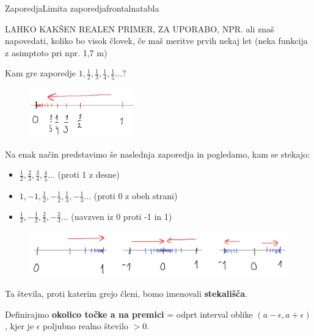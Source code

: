\begin{priprava}{}{}{Zaporedja}{Limita zaporedja}{frontalna}{tabla}

LAHKO KAKŠEN REALEN PRIMER, ZA UPORABO, NPR. ali znaš napovedati, koliko bo visok človek, če maš meritve prvih nekaj let (neka funkcija z asimptoto pri npr. 1,7 m)

 Kam gre zaporedje $ 1, \frac{1}{2}, \frac{1}{3}, \frac{1}{4},\frac{1}{5} \ldots $? 

\begin{figure}[h]
    \centering
    \includegraphics[width=0.4\textwidth]{slike/lim1.png}
\end{figure}

Na enak način predstavimo še naslednja zaporedja in pogledamo, kam se stekajo:
\begin{itemize}
    \item $ \frac{1}{2}, \frac{2}{3}, \frac{3}{4}, \frac{4}{5} \ldots $  (proti 1 z desne)
    \item $ 1, -1, \frac{1}{2}, -\frac{1}{2}, \frac{1}{3}, -\frac{1}{3} \ldots $ (proti 0 z obeh strani)
    \item $ \frac{1}{2}, -\frac{1}{2}, \frac{2}{3}, -\frac{2}{3} \ldots $ (navzven iz 0 proti -1 in 1)
\end{itemize}

\begin{figure}[h]
    \centering
    \includegraphics[width=\textwidth]{slike/lim2.png}
\end{figure}

Ta števila, proti katerim grejo členi, bomo imenovali \textbf{stekališča}.

Definirajmo \textbf{okolico točke a na premici} = odprt interval oblike $ (a - \epsilon, a + \epsilon) $, kjer je $\epsilon$ poljubno realno število $ > 0 $.


\end{priprava}
